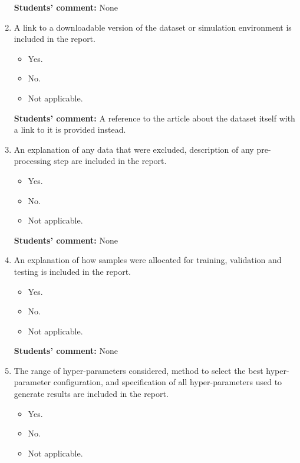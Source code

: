 \documentclass{article}
\begin{document}
\begin{enumerate}
    \textbf{Students' comment:} None
    
    \item A link to a downloadable version of the dataset or simulation environment is included in the report.
    \begin{itemize}
        \item [\faSquareO] Yes.
        \item [\faCheckSquareO] No.
        \item [\faSquareO] Not applicable.
    \end{itemize}
    
    \textbf{Students' comment:} A reference to the article \cite{DataSet} about the dataset itself with a link to it is provided instead.
    
    \item An explanation of any data that were excluded, description of any pre-processing step are included in the report.
    \begin{itemize}
        \item [\faCheckSquareO] Yes.
        \item [\faSquareO] No.
        \item [\faSquareO] Not applicable.
    \end{itemize}
    
    \textbf{Students' comment:} None
    
    \item An explanation of how samples were allocated for training, validation and testing is included in the report.
    \begin{itemize}
        \item [\faCheckSquareO] Yes.
        \item [\faSquareO] No.
        \item [\faSquareO] Not applicable.
    \end{itemize}
    
    \textbf{Students' comment:} None
    
    \item The range of hyper-parameters considered, method to select the best hyper-parameter
configuration, and specification of all hyper-parameters used to generate results are included in the report.
    \begin{itemize}
        \item [\faCheckSquareO] Yes.
        \item [\faSquareO] No.
        \item [\faSquareO] Not applicable.
    \end{itemize}
    

\end{enumerate}
\end{document}
